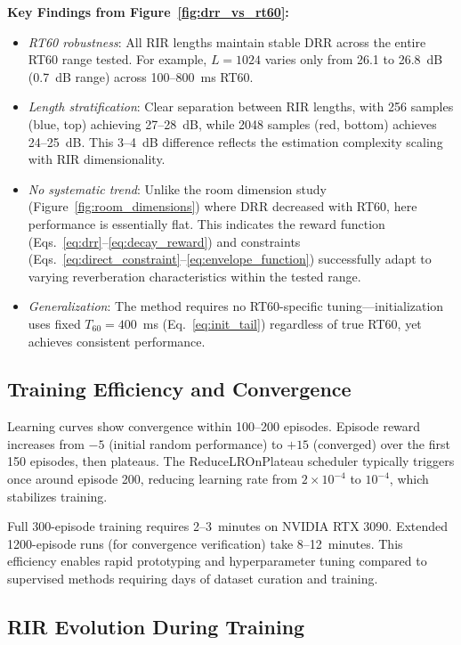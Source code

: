 \documentclass[12pt,a4paper]{article}
\begin{document}
\textbf{Key Findings from Figure~\ref{fig:drr_vs_rt60}:}
\begin{itemize}
\item \textit{RT60 robustness}: All RIR lengths maintain stable DRR across the entire RT60 range tested. For example, $L=1024$ varies only from 26.1 to 26.8~dB (0.7~dB range) across 100--800~ms RT60.
\item \textit{Length stratification}: Clear separation between RIR lengths, with 256 samples (blue, top) achieving 27--28~dB, while 2048 samples (red, bottom) achieves 24--25~dB. This 3--4~dB difference reflects the estimation complexity scaling with RIR dimensionality.
\item \textit{No systematic trend}: Unlike the room dimension study (Figure~\ref{fig:room_dimensions}) where DRR decreased with RT60, here performance is essentially flat. This indicates the reward function (Eqs.~\eqref{eq:drr}--\eqref{eq:decay_reward}) and constraints (Eqs.~\eqref{eq:direct_constraint}--\eqref{eq:envelope_function}) successfully adapt to varying reverberation characteristics within the tested range.
\item \textit{Generalization}: The method requires no RT60-specific tuning---initialization uses fixed $T_{60}=400$~ms (Eq.~\eqref{eq:init_tail}) regardless of true RT60, yet achieves consistent performance.
\end{itemize}

\subsection{Training Efficiency and Convergence}

Learning curves show convergence within 100--200 episodes. Episode reward increases from $-5$ (initial random performance) to $+15$ (converged) over the first 150 episodes, then plateaus. The ReduceLROnPlateau scheduler typically triggers once around episode 200, reducing learning rate from $2\times10^{-4}$ to $10^{-4}$, which stabilizes training.

Full 300-episode training requires 2--3~minutes on NVIDIA RTX 3090. Extended 1200-episode runs (for convergence verification) take 8--12~minutes. This efficiency enables rapid prototyping and hyperparameter tuning compared to supervised methods requiring days of dataset curation and training.

\subsection{RIR Evolution During Training}
\end{document}
